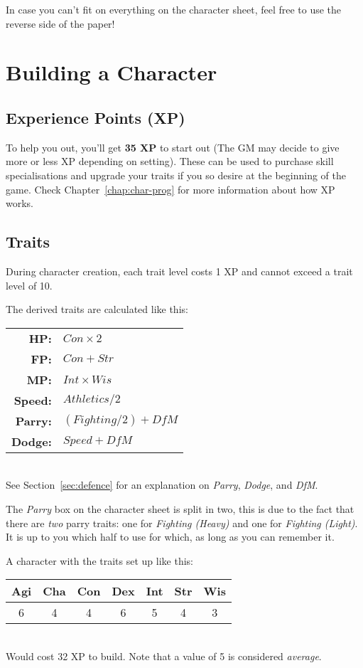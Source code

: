\note In case you can't fit on everything on the character sheet, feel free to use the reverse side of the paper!

\section{Building a Character}
\subsection{Experience Points (XP)}
To help you out, you'll get \textbf{35 XP} to start out (The GM may decide to give more or less XP depending on setting).
These can be used to purchase skill specialisations and upgrade your traits if you so desire at the beginning of the game.
Check Chapter~\ref{chap:char-prog} for more information about how XP works.

\subsection{Traits}
During character creation, each trait level costs 1 XP and cannot exceed a trait level of 10.

The derived traits are calculated like this:

\begin{tabular} {r | l} 
\textbf{HP:} & $Con \times 2$ \\
\textbf{FP:} & $Con + Str$ \\
\textbf{MP:} & $Int \times Wis$ \\
\textbf{Speed:} & $Athletics / 2$\\
\textbf{Parry:} & $(Fighting / 2) + \mathit{DfM}$\\
\textbf{Dodge:} & $Speed + \mathit{DfM}$ \\
\end{tabular}\\
See Section~\ref{sec:defence} for an explanation on \textit{Parry}, \textit{Dodge}, and \textit{DfM}.

\note The \textit{Parry} box on the character sheet is split in two, this is due to the fact that there are \textit{two} parry traits: one for \textit{Fighting (Heavy)} and one for \textit{Fighting (Light)}.
It is up to you which half to use for which, as long as you can remember it.

\example A character with the traits set up like this:

\begin{tabular}{ccccccc}
    \textbf{Agi} & \textbf{Cha} & \textbf{Con} & \textbf{Dex} & \textbf{Int} & \textbf{Str} & \textbf{Wis} \\\hline
    6 & 4 & 4 & 6 & 5 & 4 & 3\\ 
\end{tabular}\\
Would cost 32 XP to build.
Note that a value of 5 is considered \textit{average}.

